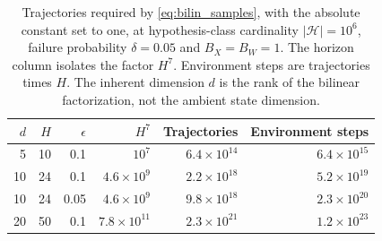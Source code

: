 \begin{table}[htbp]
\centering
\caption{Trajectories required by \eqref{eq:bilin_samples}, with the absolute constant set to one, at hypothesis-class cardinality $|\mathcal{H}| = 10^{6}$, failure probability $\delta = 0.05$ and $B_X = B_W = 1$. The horizon column isolates the factor $H^7$. Environment steps are trajectories times $H$. The inherent dimension $d$ is the rank of the bilinear factorization, not the ambient state dimension.}
\label{tab:curse_sample_complexity}
\begin{tabular}{rrrrrr}
\toprule
$d$ & $H$ & $\epsilon$ & $H^7$ & Trajectories & Environment steps \\
\midrule
5 & 10 & 0.1 & $10^{7}$ & $6.4 \times 10^{14}$ & $6.4 \times 10^{15}$ \\
10 & 24 & 0.1 & $4.6 \times 10^{9}$ & $2.2 \times 10^{18}$ & $5.2 \times 10^{19}$ \\
10 & 24 & 0.05 & $4.6 \times 10^{9}$ & $9.8 \times 10^{18}$ & $2.3 \times 10^{20}$ \\
20 & 50 & 0.1 & $7.8 \times 10^{11}$ & $2.3 \times 10^{21}$ & $1.2 \times 10^{23}$ \\
\bottomrule
\end{tabular}
\end{table}
